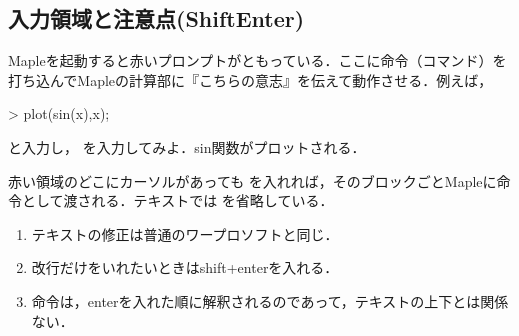 \subsection{入力領域と注意点(ShiftEnter)}
Mapleを起動すると赤いプロンプトがともっている．ここに命令（コマンド）を打ち込んでMapleの計算部に『こちらの意志』を伝えて動作させる．例えば，
\begin{MapleInput}
> plot(sin(x),x); 
\end{MapleInput}
と入力し，
\ifHIKI
[ Enter ]
\else
{}
\fi
を入力してみよ．sin関数がプロットされる．

赤い領域のどこにカーソルがあっても
\ifHIKI
[ Enter ]
\else
{}
\fi
を入れれば，そのブロックごとMapleに命令として渡される．テキストでは
\ifHIKI
[ Enter ]
\else
{}
\fi
を省略している．

\begin{enumerate}
\item テキストの修正は普通のワープロソフトと同じ．
\item 改行だけをいれたいときはshift+enterを入れる．
\item 命令は，enterを入れた順に解釈されるのであって，テキストの上下とは関係ない．
\end{enumerate}
